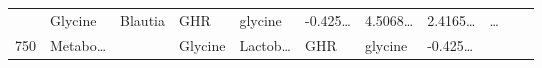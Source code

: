 \documentclass[
]{article}
\begin{document}
\begin{longtable}[]{@{}lllllllllll@{}}
\begin{minipage}[t]{0.07\columnwidth}
\strut
\end{minipage} & \begin{minipage}[t]{0.09\columnwidth}\raggedright
Glycine\strut
\end{minipage} & \begin{minipage}[t]{0.07\columnwidth}\raggedright
Blautia\strut
\end{minipage} & \begin{minipage}[t]{0.07\columnwidth}\raggedright
GHR\strut
\end{minipage} & \begin{minipage}[t]{0.09\columnwidth}\raggedright
glycine\strut
\end{minipage} & \begin{minipage}[t]{0.07\columnwidth}\raggedright
-0.425\ldots{}\strut
\end{minipage} & \begin{minipage}[t]{0.07\columnwidth}\raggedright
4.5068\ldots{}\strut
\end{minipage} & \begin{minipage}[t]{0.07\columnwidth}\raggedright
2.4165\ldots{}\strut
\end{minipage} & \begin{minipage}[t]{0.03\columnwidth}\raggedright
\ldots{}\strut
\end{minipage}\tabularnewline
\begin{minipage}[t]{0.03\columnwidth}\raggedright
750\strut
\end{minipage} & \begin{minipage}[t]{0.07\columnwidth}\raggedright
Metabo\ldots{}\strut
\end{minipage} & \begin{minipage}[t]{0.07\columnwidth}\raggedright
\strut
\end{minipage} & \begin{minipage}[t]{0.09\columnwidth}\raggedright
Glycine\strut
\end{minipage} & \begin{minipage}[t]{0.07\columnwidth}\raggedright
Lactob\ldots{}\strut
\end{minipage} & \begin{minipage}[t]{0.07\columnwidth}\raggedright
GHR\strut
\end{minipage} & \begin{minipage}[t]{0.09\columnwidth}\raggedright
glycine\strut
\end{minipage} & \begin{minipage}[t]{0.07\columnwidth}\raggedright
-0.425\ldots{}\strut

\end{minipage}
\end{longtable}
\end{document}

